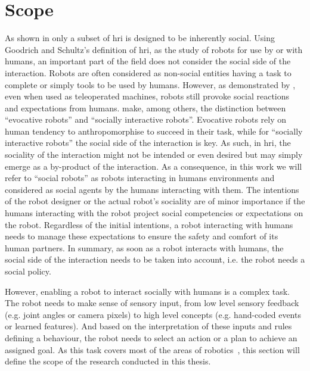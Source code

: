 \section{Scope}\label{sec:intro_scope}

As shown in \cite{goodrich2007human} only a subset of \gls{hri} is designed to be inherently social. Using Goodrich and Schultz's definition of \gls{hri}, as the study of robots for use by or with humans, an important part of the field does not consider the social side of the interaction. Robots are often considered as non-social entities having a task to complete or simply tools to be used by humans. However, as demonstrated by \cite{fincannon2004evidence}, even when used as teleoperated machines, robots still provoke social reactions and expectations from humans. \cite{fong2003survey} make, among others, the distinction between ``evocative robots'' and ``socially interactive robots''. Evocative robots rely on human tendency to anthropomorphise to succeed in their task, while for ``socially interactive robots'' the social side of the interaction is key. As such, in \gls{hri}, the sociality of the interaction might not be intended or even desired but may simply emerge as a by-product of the interaction. As a consequence, in this work we will refer to ``social robots'' as robots interacting in humans environments and considered as social agents by the humans interacting with them. The intentions of the robot designer or the actual robot's sociality are of minor importance if the humans interacting with the robot project social competencies or expectations on the robot. Regardless of the initial intentions, a robot interacting with humans needs to manage these expectations to ensure the safety and comfort of its human partners. In summary, as soon as a robot interacts with humans, the social side of the interaction needs to be taken into account, i.e. the robot needs a social policy. 

However, enabling a robot to interact socially with humans is a complex task. The robot needs to make sense of sensory input, from low level sensory feedback (e.g. joint angles or camera pixels) to high level concepts (e.g. hand-coded events or learned features). And based on the interpretation of these inputs and rules defining a behaviour, the robot needs to select an action or a plan to achieve an assigned goal. As this task covers most of the areas of robotics~\citep{fong2003survey}, this section will define the scope of the research conducted in this thesis.

